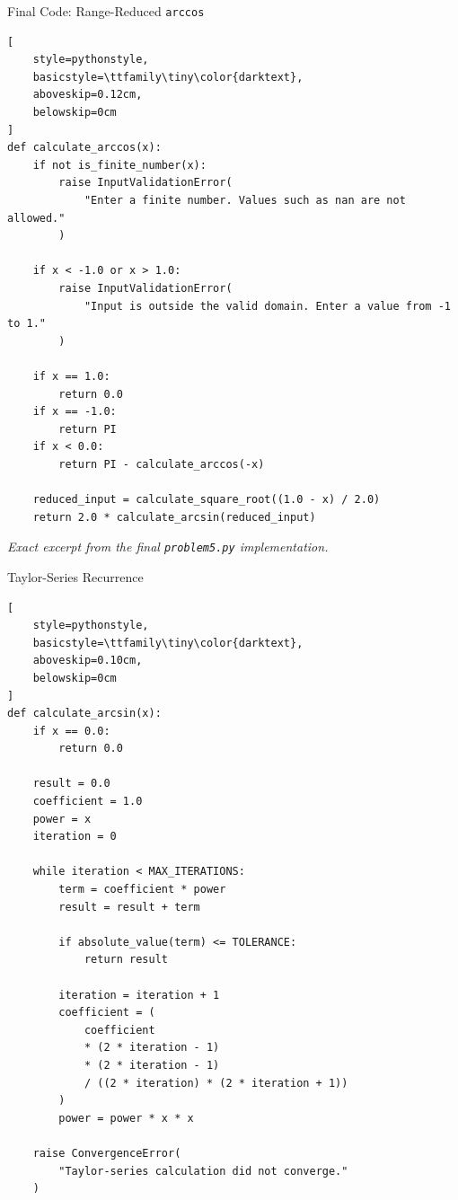 \documentclass[aspectratio=169]{beamer}
\begin{document}
\begin{frame}[fragile]{Final Code: Range-Reduced \texttt{arccos}}

\begin{lstlisting}[
    style=pythonstyle,
    basicstyle=\ttfamily\tiny\color{darktext},
    aboveskip=0.12cm,
    belowskip=0cm
]
def calculate_arccos(x):
    if not is_finite_number(x):
        raise InputValidationError(
            "Enter a finite number. Values such as nan are not allowed."
        )

    if x < -1.0 or x > 1.0:
        raise InputValidationError(
            "Input is outside the valid domain. Enter a value from -1 to 1."
        )

    if x == 1.0:
        return 0.0
    if x == -1.0:
        return PI
    if x < 0.0:
        return PI - calculate_arccos(-x)

    reduced_input = calculate_square_root((1.0 - x) / 2.0)
    return 2.0 * calculate_arcsin(reduced_input)
\end{lstlisting}

\vspace{-0.10cm}
\scriptsize\textit{Exact excerpt from the final \texttt{problem5.py} implementation.}

\end{frame}

\begin{frame}[fragile]{Taylor-Series Recurrence}

\begin{lstlisting}[
    style=pythonstyle,
    basicstyle=\ttfamily\tiny\color{darktext},
    aboveskip=0.10cm,
    belowskip=0cm
]
def calculate_arcsin(x):
    if x == 0.0:
        return 0.0

    result = 0.0
    coefficient = 1.0
    power = x
    iteration = 0

    while iteration < MAX_ITERATIONS:
        term = coefficient * power
        result = result + term

        if absolute_value(term) <= TOLERANCE:
            return result

        iteration = iteration + 1
        coefficient = (
            coefficient
            * (2 * iteration - 1)
            * (2 * iteration - 1)
            / ((2 * iteration) * (2 * iteration + 1))
        )
        power = power * x * x

    raise ConvergenceError(
        "Taylor-series calculation did not converge."
    )
\end{lstlisting}
\end{frame}
\end{document}
